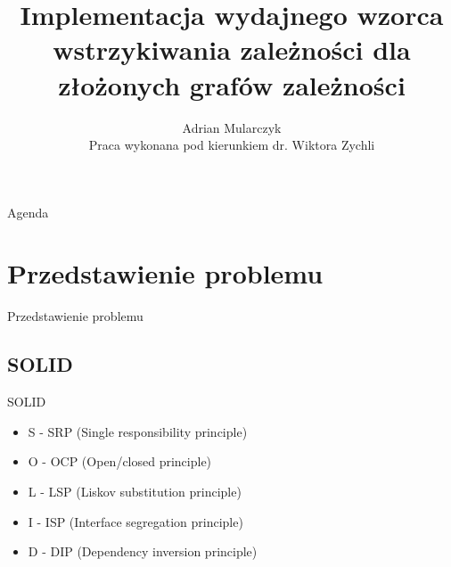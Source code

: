\documentclass{beamer}
\title[]
{Implementacja wydajnego wzorca wstrzykiwania zależności dla złożonych grafów zależności}
\author[Adrian Mularczyk]{Adrian Mularczyk \\[10pt]{\footnotesize Praca wykonana pod kierunkiem dr. Wiktora Zychli}}
\institute[Uniwersytet Wrocławski]
{
Uniwersytet Wrocławski\\
Wydział Matematyki i Informatyki\\
Kierunek: Informatyka
}
\date{}
\begin{document}
\begin{frame}
  \titlepage 
\end{frame}

\begin{frame}{Agenda}
  \tableofcontents
\end{frame}

\section{Przedstawienie problemu}

\begin{frame}{}
\begin{center}
\huge{Przedstawienie problemu}
\end{center}
\end{frame}

\subsection*{SOLID}

\begin{frame}{SOLID}
\begin{itemize}
	\item S - SRP (Single responsibility principle)
	\item O - OCP (Open/closed principle)
	\item L - LSP (Liskov substitution principle)
	\item I - ISP (Interface segregation principle)
	\item D - DIP (Dependency inversion principle)
\end{itemize}
\end{frame}
\end{document}
